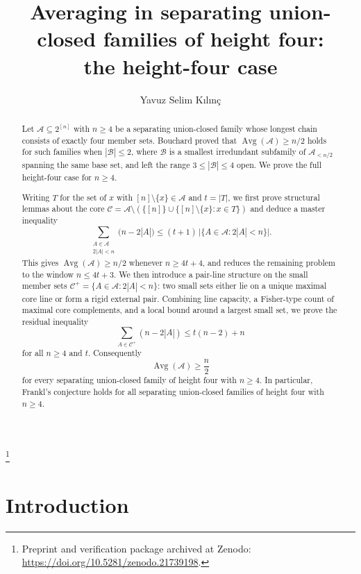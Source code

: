 \documentclass[11pt,a4paper]{amsart}
\theoremstyle{plain}
\theoremstyle{definition}
\newcommand{\A}{\mathcal{A}}
\newcommand{\B}{\mathcal{B}}
\newcommand{\Cc}{\mathcal{C}}
\newcommand{\Avg}{\operatorname{Avg}}
\newcommand{\Cp}{\Cc^{+}}
\begin{document}
\title[Averaging in separating union-closed families of height four]
{Averaging in separating union-closed families of height four:\\ the height-four case}

\author{Yavuz Selim K\i l\i n\c{c}}
\thanks{Preprint and verification package archived at Zenodo:
\url{https://doi.org/10.5281/zenodo.21739198}.}
\address{Independent researcher, T\"urkiye}


\begin{abstract}
Let $\A\subseteq 2^{[n]}$ with $n\ge4$ be a separating union-closed family whose longest chain
consists of exactly four member sets. Bouchard proved that
$\Avg(\A)\ge n/2$ holds for such families when $|\B|\le 2$, where $\B$ is a smallest
irredundant subfamily of $\A_{<n/2}$ spanning the same base set, and left the
range $3\le|\B|\le4$ open. We prove the full height-four case for $n\ge4$.

Writing $T$ for the set of $x$ with $[n]\setminus\{x\}\in\A$ and $t=|T|$, we first
prove structural lemmas about the core
$\Cc=\A\setminus(\{[n]\}\cup\{[n]\setminus\{x\}:x\in T\})$ and deduce a master
inequality
\[
  \sum_{\substack{A\in\A\\2|A|<n}}\bigl(n-2|A|\bigr)
  \le
  (t+1)\,\bigl|\{A\in\A:2|A|<n\}\bigr|.
\]
This gives $\Avg(\A)\ge n/2$ whenever $n\ge4t+4$, and reduces the remaining
problem to the window $n\le4t+3$. We then introduce a pair-line structure on the
small member sets $\Cp=\{A\in\A:2|A|<n\}$: two small sets either lie on a unique
maximal core line or form a rigid external pair. Combining line capacity, a
Fisher-type count of maximal core complements, and a local bound around a
largest small set, we prove the residual inequality
\[
  \sum_{A\in\Cp}(n-2|A|)\le t(n-2)+n
\]
for all $n\ge4$ and $t$. Consequently
\[
  \Avg(\A)\ge \frac n2
\]
for every separating union-closed family of height four with $n\ge4$. In particular, Frankl's
conjecture holds for all separating union-closed families of height four with $n\ge4$.
\end{abstract}

\maketitle

\section{Introduction}
\end{document}
